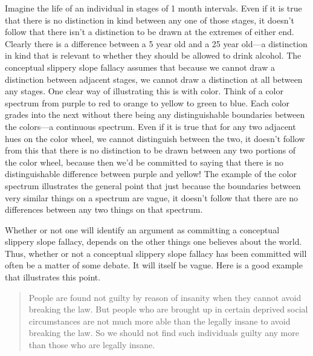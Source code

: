 Imagine the life of an individual in stages of 1 month intervals. Even if it is true that there is no distinction in kind between any one of those stages, it doesn't follow that there isn't a distinction to be drawn at the extremes of either end. Clearly there is a difference between a 5 year old and a 25 year old---a distinction in kind that is relevant to whether they should be allowed to drink alcohol. The conceptual slippery slope fallacy assumes that because we cannot draw a distinction between adjacent stages, we cannot draw a distinction at all between any stages. One clear way of illustrating this is with color. Think of a color spectrum from purple to red to orange to yellow to green to blue. Each color grades into the next without there being any distinguishable boundaries between the colors---a continuous spectrum. Even if it is true that for any two adjacent hues on the color wheel, we cannot distinguish between the two, it doesn't follow from this that there is no distinction to be drawn between any two portions of the color wheel, because then we'd be committed to saying that there is no distinguishable difference between purple and yellow! The example of the color spectrum illustrates the general point that just because the boundaries between very similar things on a spectrum are vague, it doesn't follow that there are no differences between any two things on that spectrum.

Whether or not one will identify an argument as committing a conceptual slippery slope fallacy, depends on the other things one believes about the world. Thus, whether or not a conceptual slippery slope fallacy has been committed will often be a matter of some debate. It will itself be vague. Here is a good
example that illustrates this point.

\begin{quote}
People are found not guilty by reason of insanity when they cannot avoid breaking the law. But people who are brought up in certain deprived social circumstances are not much more able than the legally insane to avoid breaking the law. So we should not find such individuals guilty any more than those who are legally insane.
\end{quote}

